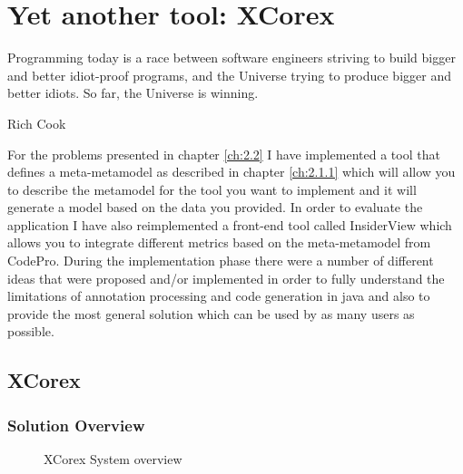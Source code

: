 \chapter{Yet another tool: XCorex }\label{ch:3}

\epigraph{Programming today is a race between software engineers striving to
build bigger and better idiot-proof programs, and the Universe trying to produce
bigger and better idiots. So far, the Universe is winning.}{Rich Cook}

	For the problems presented in chapter \ref{ch:2.2} I have implemented a tool
that defines a meta-metamodel as described in chapter \ref{ch:2.1.1} which will
allow you to describe the metamodel for the tool you want to implement and it will generate 
a model based on the data you provided. In order to evaluate the application I
have also reimplemented a front-end tool called InsiderView \cite{tools:iPlasma}
which allows you to integrate different metrics based on the meta-metamodel from 
CodePro.
	During the implementation phase there were a number of different ideas
that were proposed and/or implemented in order to fully understand the
limitations of annotation processing and code generation in java and also to
provide the most general solution which can be used by as many users as
possible.

\section{XCorex}

\subsection{Solution Overview}
	 
\begin{figure}
\centering
{}
\caption{XCorex System overview}
\label{fig:XCorexSystem}
\end{figure}

